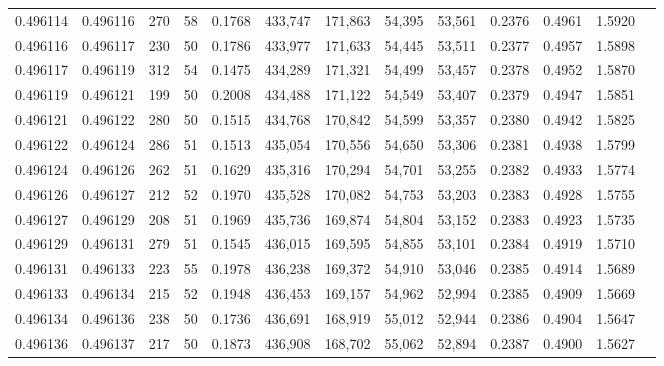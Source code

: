 \begin{tabular}{rrrrrrrrrrrrr}
0.496114 & 0.496116 &   270 &  58 &                                     0.1768 & 433,747 & 171,863 &  54,395 &  53,561 & 0.2376 & 0.4961 & 1.5920 \\
0.496116 & 0.496117 &   230 &  50 &                                     0.1786 & 433,977 & 171,633 &  54,445 &  53,511 & 0.2377 & 0.4957 & 1.5898 \\
0.496117 & 0.496119 &   312 &  54 &                                     0.1475 & 434,289 & 171,321 &  54,499 &  53,457 & 0.2378 & 0.4952 & 1.5870 \\
0.496119 & 0.496121 &   199 &  50 &                                     0.2008 & 434,488 & 171,122 &  54,549 &  53,407 & 0.2379 & 0.4947 & 1.5851 \\
0.496121 & 0.496122 &   280 &  50 &                                     0.1515 & 434,768 & 170,842 &  54,599 &  53,357 & 0.2380 & 0.4942 & 1.5825 \\
0.496122 & 0.496124 &   286 &  51 &                                     0.1513 & 435,054 & 170,556 &  54,650 &  53,306 & 0.2381 & 0.4938 & 1.5799 \\
0.496124 & 0.496126 &   262 &  51 &                                     0.1629 & 435,316 & 170,294 &  54,701 &  53,255 & 0.2382 & 0.4933 & 1.5774 \\
0.496126 & 0.496127 &   212 &  52 &                                     0.1970 & 435,528 & 170,082 &  54,753 &  53,203 & 0.2383 & 0.4928 & 1.5755 \\
0.496127 & 0.496129 &   208 &  51 &                                     0.1969 & 435,736 & 169,874 &  54,804 &  53,152 & 0.2383 & 0.4923 & 1.5735 \\
0.496129 & 0.496131 &   279 &  51 &                                     0.1545 & 436,015 & 169,595 &  54,855 &  53,101 & 0.2384 & 0.4919 & 1.5710 \\
0.496131 & 0.496133 &   223 &  55 &                                     0.1978 & 436,238 & 169,372 &  54,910 &  53,046 & 0.2385 & 0.4914 & 1.5689 \\
0.496133 & 0.496134 &   215 &  52 &                                     0.1948 & 436,453 & 169,157 &  54,962 &  52,994 & 0.2385 & 0.4909 & 1.5669 \\
0.496134 & 0.496136 &   238 &  50 &                                     0.1736 & 436,691 & 168,919 &  55,012 &  52,944 & 0.2386 & 0.4904 & 1.5647 \\
0.496136 & 0.496137 &   217 &  50 &                                     0.1873 & 436,908 & 168,702 &  55,062 &  52,894 & 0.2387 & 0.4900 & 1.5627 \\

\end{tabular}

